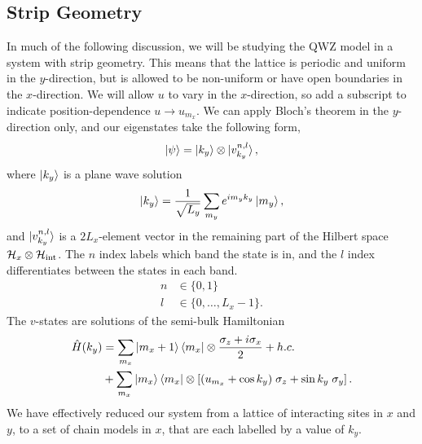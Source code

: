 \subsection{Strip Geometry} \label{sec:QWZ_strip_geometry}
In much of the following discussion, we will be studying the QWZ model in a system with strip geometry. This means that the lattice is periodic and uniform in the $y$-direction, but is allowed to be non-uniform or have open boundaries in the $x$-direction. We will allow $u$ to vary in the $x$-direction, so add a subscript to indicate position-dependence $u \rightarrow u_{m_x}$. We can apply Bloch's theorem in the $y$-direction only, and our eigenstates take the following form,
\begin{align}
    \ket{\psi} = \ket{k_y}\otimes \ket{v_{k_y}^{n,l}},
\end{align}
where $\ket{k_y}$ is a plane wave solution
\begin{align}
    \ket{k_y} =\frac{1}{\sqrt{L_y}} \sum_{m_y} e^{i m_y k_y}\ket{m_y},
\end{align}
and $\ket{v_{k_y}^{n,l}}$ is a $2L_x$-element vector in the remaining part of the Hilbert space $\mathcal H_x \otimes \mathcal H_{\textup{int}} $. The $n$ index labels which band the state is in, and the $l$ index differentiates between the states in each band.
\begin{align}
    n &\in \{0,1\}\\
    l &\in \{ 0, \dots ,L_x -1\}.
\end{align}
The $v$-states are solutions of the semi-bulk Hamiltonian
\begin{align}
    \hat H(k_y) &= \sum_{m_x} \ket{m_x+1}\bra{m_x} \otimes \frac{\sigma_z + i\sigma_x}{2} + h.c.\nonumber \\
    &+ \sum_{m_x} \ket{m_x}\bra{m_x} \otimes \left [ (u_{m_x} + \cos k_y) \; \sigma_z + \sin k_y \; \sigma_y  \right ].
\end{align}
We have effectively reduced our system from a lattice of interacting sites in $x$ and $y$, to a set of chain models in $x$, that are each labelled by a value of $k_y$.
